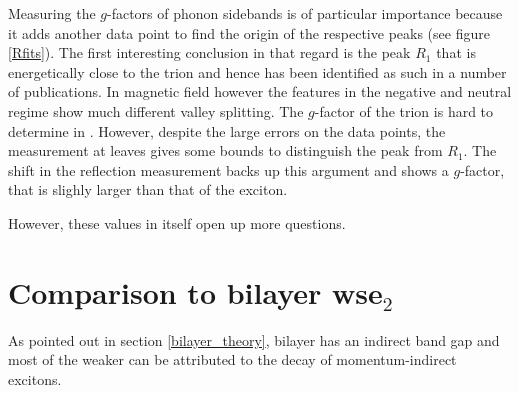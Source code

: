Measuring the $g$-factors of phonon sidebands is of particular importance because it adds another data point to find the origin of the respective peaks (see figure \ref{Rfits}). The first interesting conclusion in that regard is the peak $R_1$ that is energetically close to the trion and hence has been identified as such in a number of publications. In magnetic field however the features in the negative and neutral regime show much different valley splitting. The $g$-factor of the trion is hard to determine in \pl\!. However, despite the large errors on the data points, the measurement at leaves gives some bounds to distinguish the peak from $R_1$. The shift in the reflection measurement backs up this argument and shows a $g$-factor, that is slighly larger than that of the exciton.

However, these values in itself open up more questions.

\section{Comparison to bilayer ws\textup{e}$_2$}

As pointed out in section \ref{bilayer_theory}, bilayer \wse has an indirect band gap and most of the weaker \pl can be attributed to the decay of momentum-indirect excitons.
